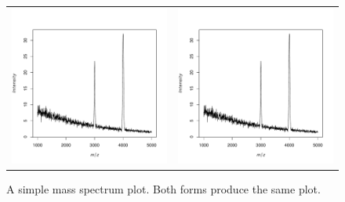 \documentclass[a4paper]{article}
\begin{document}
\begin{figure}
\begin{center}
\begin{tabular}{cc}
\includegraphics{Cardinal-demo-019}
&
\includegraphics{Cardinal-demo-020}
\end{tabular}
\caption{\small A simple mass spectrum plot. Both forms produce the same plot.}
\end{center}
\end{figure}
\end{document}
